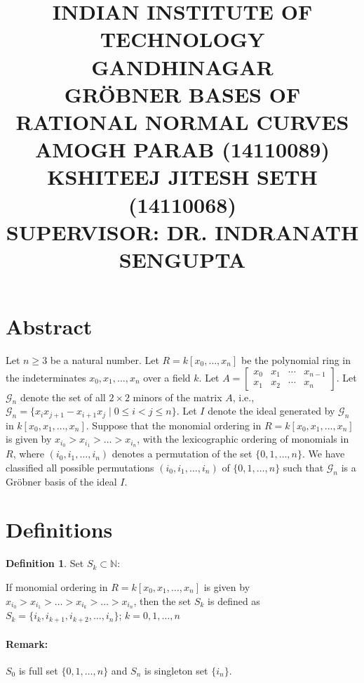 \documentclass[12pt,a4paper]{article}
\title{
{\bf\Large INDIAN INSTITUTE OF TECHNOLOGY GANDHINAGAR}\\[1in]
{\bf\Large GR\"{O}BNER BASES OF RATIONAL NORMAL CURVES}\\[1in]
{\bf\large AMOGH PARAB (14110089)}\\[2mm]
{\bf\large KSHITEEJ JITESH SETH (14110068)}\\[1in]
{\bf\large SUPERVISOR: DR. INDRANATH SENGUPTA}\\[2mm]
}
\theoremstyle{definition}
\newtheorem{definition}{Definition}
\begin{document}
\maketitle
\newpage
{}


\section*{Abstract}

\noindent Let $n\geq 3$ be a natural number. Let $R = k[x_{0}, \ldots , x_{n}]$ be the 
polynomial ring in the indeterminates $x_{0}, x_{1} , \ldots , x_{n}$ over a field $k$. Let 
$A = \left[\begin{matrix}
x_{0} & x_{1} & \cdots & x_{n-1}\\
x_{1} & x_{2} & \cdots & x_{n}
\end{matrix}\right]$. 
Let $\mathcal{G}_n$ denote the set of all $2\times 2$ minors of the matrix $A$, i.e., 
$\mathcal{G}_n = \{x_{i}x_{j+1}-x_{i+1}x_{j} \mid 0 \leq i < j \leq n\}$. Let $I$ denote 
the  ideal  generated by $\mathcal{G}_n$ in $k[x_{0}, x_{1},...,x_{n}]$. Suppose that 
the monomial ordering in $R =  k[x_{0}, x_{1},...,x_{n}]$ is given by 
$x_{i_{0}} > x_{i_{1}}> \ldots > x_{i_{n}}$, with the lexicographic ordering of monomials in $R$, 
where $(i_{0}, i_{1}, \ldots , i_{n})$ denotes a permutation of the set $\{0, 1, \ldots , n\}$. 
We have classified all possible permutations $(i_{0}, i_{1}, \ldots , i_{n})$ of $\{0, 1, \ldots , n\}$ 
such that $\mathcal{G}_n$ is a Gr\"{o}bner basis of the ideal $I$.




\section*{Definitions}
\theoremstyle{definition}
\begin{definition}{Set $S_k \subset \mathbb{N}$:}

\noindent If monomial ordering in $R=k[x_0,x_1,\ldots , x_n]$ is given by $x_{i_{0}}> x_{i_{1}}> \ldots> x_{i_{k}}> \ldots> x_{i_{n}}$, then the set $S_k$ is defined as $S_{k}=\{i_{k}, i_{k+1}, i_{k+2}, \ldots, i_{n}\}$; $k=0,1,\ldots ,n$

\end{definition}

\paragraph*{Remark:}
$S_0$ is full set $\{0,1,\ldots, n\}$ and $S_n$ is singleton set $\{i_n\}$.
\end{document}
